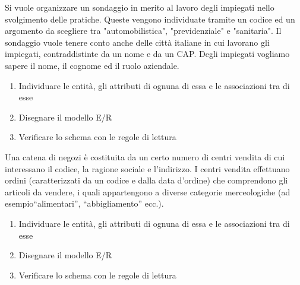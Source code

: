 \documentclass[addpoints]{exam}
\begin{document}
 
\begin{center}
\end{center}
 
\vspace{5mm}
 
 
\vspace{5mm}
 
 
\begin{questions}
	
\question[5] Si vuole organizzare un sondaggio in merito al lavoro degli impiegati nello svolgimento delle pratiche. Queste vengono individuate tramite un codice ed un argomento da scegliere tra "automobilistica", "previdenziale" e "sanitaria". Il sondaggio vuole tenere conto anche delle città italiane in cui lavorano gli impiegati, contraddistinte da un nome e da un CAP. Degli impiegati vogliamo sapere il nome, il cognome ed il ruolo aziendale.
\begin{enumerate}
	\item Individuare le entità, gli attributi di ognuna di essa e le associazioni tra di esse
	\item Disegnare il modello E/R
	\item Verificare lo schema con le regole di lettura
\end{enumerate}
 
\question[5] 		Una catena di negozi è costituita da un certo numero di centri vendita di cui interessano il codice, la ragione sociale e l’indirizzo. I centri vendita effettuano ordini (caratterizzati da un codice e dalla data d’ordine) che comprendono gli articoli da vendere, i quali appartengono a diverse categorie merceologiche (ad esempio“alimentari”, “abbigliamento” ecc.).
\begin{enumerate}
	\item Individuare le entità, gli attributi di ognuna di essa e le associazioni tra di esse
	\item Disegnare il modello E/R
	\item Verificare lo schema con le regole di lettura
\end{enumerate}

\end{questions}

\begin{center}
	\gradetable[h][questions]
\end{center}
\end{document}
